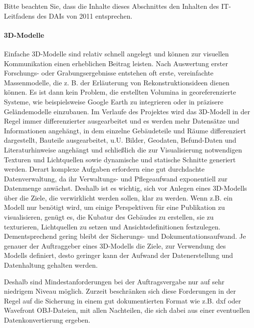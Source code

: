 %
%

Bitte beachten Sie, dass die Inhalte dieses Abschnittes den Inhalten des IT-Leitfadens des DAIs von 2011 entsprechen.
\begin{center}
\tib{\rule{0.9\textwidth}{0.2mm}}\vspace{3mm}
\end{center}

\paragraph{3D-Modelle}
Einfache 3D-Modelle sind relativ schnell angelegt und können zur visuellen Kommunikation einen erheblichen Beitrag leisten. Nach Auswertung erster Forschungs- oder Grabungsergebnisse entstehen oft erste, vereinfachte Massenmodelle, die z. B. der Erläuterung von Rekonstruktionsideen dienen können. Es ist dann kein Problem, die erstellten Volumina in georeferenzierte Systeme, wie beispielsweise Google Earth zu integrieren oder in präzisere Geländemodelle einzubauen. Im Verlaufe des Projektes wird das 3D-Modell in der Regel immer differenzierter ausgearbeitet und es werden mehr Datensätze und Informationen angehängt, in dem einzelne Gebäudeteile und Räume differenziert dargestellt, Bauteile ausgearbeitet, u.U. Bilder, Geodaten, Befund-Daten und Literaturhinweise angehängt und schließlich die zur Visualisierung notwendigen Texturen und Lichtquellen sowie dynamische und statische Schnitte generiert werden. Derart komplexe Aufgaben erfordern eine gut durchdachte Datenverwaltung, da ihr Verwaltungs- und Pflegeaufwand exponentiell zur Datenmenge anwächst. Deshalb ist es wichtig, sich vor Anlegen eines 3D-Modells über die Ziele, die verwirklicht werden sollen, klar zu werden. Wenn z.B. ein Modell nur benötigt wird, um einige Perspektiven für eine Publikation zu visualisieren, genügt es, die Kubatur des Gebäudes zu erstellen, sie zu texturieren, Lichtquellen zu setzen und Ansichtsdefinitionen festzulegen. Dementsprechend gering bleibt der Sicherungs- und Dokumentationsaufwand. Je genauer der Auftraggeber eines 3D-Modells die Ziele, zur Verwendung des Modells definiert, desto geringer kann der Aufwand der Datenerstellung und Datenhaltung gehalten werden. 

Deshalb sind Mindestanforderungen bei der Auftragsvergabe nur auf sehr niedrigem Niveau möglich. Zurzeit beschränken sich diese Forderungen in der Regel auf die Sicherung in einem gut dokumentierten Format wie z.B. dxf oder Wavefront OBJ-Dateien, mit allen Nachteilen, die sich dabei aus einer eventuellen Datenkonvertierung ergeben.

